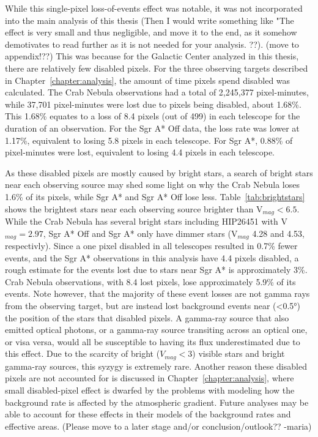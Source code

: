 {    {\color{red}While this single-pixel loss-of-events effect was notable, it was not incorporated into the main analysis of this thesis (Then I would write something like "The effect is very small and thus negligible, and move it to the end, as it somehow demotivates to read further as it is not needed for your analysis. ??)}.
    {\color{red}(move to appendix!??)}
    This was because for the Galactic Center analyzed in this thesis, there are relatively few disabled pixels.
    For the three observing targets described in Chapter~\ref{chapter:analysis}, the amount of time pixels spend disabled was calculated.
    The Crab Nebula observations had a total of 2,245,377 pixel-minutes, while 37,701 pixel-minutes were lost due to pixels being disabled, about 1.68\%.
    This 1.68\% equates to a loss of 8.4 pixels (out of 499) in each telescope for the duration of an observation.
    For the Sgr A* Off data, the loss rate was lower at 1.17\%, equivalent to losing 5.8 pixels in each telescope.
    For Sgr A*, 0.88\% of pixel-minutes were lost, equivalent to losing 4.4 pixels in each telescope.

    As these disabled pixels are mostly caused by bright stars, a search of bright stars near each observing source may shed some light on why the Crab Nebula loses 1.6\% of its pixels, while Sgr A* and Sgr A* Off lose less.
    Table~\ref{tab:brightstars} shows the brightest stars near each observing source brighter than V${}_{mag}<6.5$.
    While the Crab Nebula has several bright stars including HIP26451 with V${}_{mag} = 2.97$, Sgr A* Off and Sgr A* only have dimmer stars (V${}_{mag}$ 4.28 and 4.53, respectivly).
    Since a one pixel disabled in all telescopes resulted in 0.7\% fewer events, and the Sgr A* observations in this analysis have \nicetilde{}4.4 pixels disabled, a rough estimate for the events lost due to stars near Sgr A* is approximately 3\%.
    Crab Nebula observations, with 8.4 lost pixels, lose approximately 5.9\% of its events.
    Note however, that the majority of these event losses are not gamma rays from the observing target, but are instead lost background events near (<\ang{0.5}) the position of the stars that disabled pixels.
    A gamma-ray source that also emitted optical photons, or a gamma-ray source transiting across an optical one, or visa versa, would all be susceptible to having its flux underestimated due to this effect.
    Due to the scarcity of bright ($V_{mag}<3$) visible stars and bright gamma-ray sources, this syzygy is extremely rare.
    {\color{red}Another reason these disabled pixels are not accounted for is discussed in Chapter~\ref{chapter:analysis}, where small disabled-pixel effect is dwarfed by the problems with modeling how the background rate is affected by the atmospheric gradient.
    Future analyses may be able to account for these effects in their models of the background rates and effective areas.
    (Please move to a later stage and/or conclusion/outlook?? -maria)}

}
